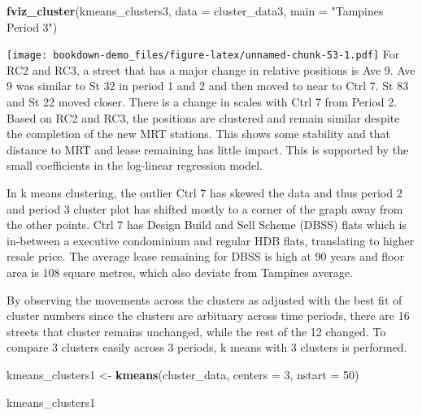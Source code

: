 \documentclass[]{book}
\newenvironment{Shaded}{\begin{snugshade}}{\end{snugshade}}
\newcommand{\KeywordTok}[1]{\textcolor[rgb]{0.13,0.29,0.53}{\textbf{#1}}}
\newcommand{\DataTypeTok}[1]{\textcolor[rgb]{0.13,0.29,0.53}{#1}}
\newcommand{\DecValTok}[1]{\textcolor[rgb]{0.00,0.00,0.81}{#1}}
\newcommand{\StringTok}[1]{\textcolor[rgb]{0.31,0.60,0.02}{#1}}
\newcommand{\NormalTok}[1]{#1}
\begin{document}
\begin{Shaded}
\begin{Highlighting}[]
\KeywordTok{fviz_cluster}\NormalTok{(kmeans_clusters3, }\DataTypeTok{data =}\NormalTok{ cluster_data3, }\DataTypeTok{main =} \StringTok{"Tampines Period 3"}\NormalTok{)}
\end{Highlighting}
\end{Shaded}

\texttt{[image: bookdown-demo\_files/figure-latex/unnamed-chunk-53-1.pdf]}
For RC2 and RC3, a street that has a major change in relative positions
is Ave 9. Ave 9 was similar to St 32 in period 1 and 2 and then moved to
near to Ctrl 7. St 83 and St 22 moved closer. There is a change in
scales with Ctrl 7 from Period 2. Based on RC2 and RC3, the positions
are clustered and remain similar despite the completion of the new MRT
stations. This shows some stability and that distance to MRT and lease
remaining has little impact. This is supported by the small coefficients
in the log-linear regression model.

In k means clustering, the outlier Ctrl 7 has skewed the data and thus
period 2 and period 3 cluster plot has shifted mostly to a corner of the
graph away from the other points. Ctrl 7 has Design Build and Sell
Scheme (DBSS) flats which is in-between a executive condominium and
regular HDB flats, translating to higher resale price. The average lease
remaining for DBSS is high at 90 years and floor area is 108 square
metres, which also deviate from Tampines average.

By observing the movements across the clusters as adjusted with the best
fit of cluster numbers since the clusters are arbituary across time
periods, there are 16 streets that cluster remains unchanged, while the
rest of the 12 changed. To compare 3 clusters easily across 3 periods, k
means with 3 clusters is performed.

\begin{Shaded}
\begin{Highlighting}[]
\NormalTok{kmeans_clusters1 <-}\StringTok{ }\KeywordTok{kmeans}\NormalTok{(cluster_data, }\DataTypeTok{centers =} \DecValTok{3}\NormalTok{, }\DataTypeTok{nstart =} \DecValTok{50}\NormalTok{)}

\NormalTok{kmeans_clusters1}
\end{Highlighting}
\end{Shaded}
\end{document}
